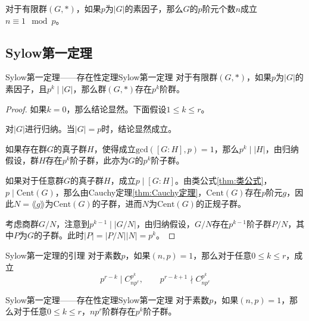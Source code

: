 \begin{corollary}
	对于有限群$(G,*)$，如果$p$为$|G|$的素因子，那么$G$的$p$阶元个数$n$成立$n\equiv 1\mod p$。
\end{corollary}

\subsection{Sylow第一定理}

\begin{theorem}{Sylow第一定理——存在性定理}{Sylow第一定理}
	对于有限群$(G,*)$，如果$p$为$|G|$的素因子，且$p^k\mid |G|$，那么群$(G,*)$存在$p^k$阶群。
\end{theorem}

\begin{proof}
	如果$k=0$，那么结论显然。下面假设$1\le k\le r$。
	
	对$|G|$进行归纳。当$|G|=p$时，结论显然成立。
	
	如果存在群$G$的真子群$H$，使得成立$\mathrm{gcd}([G:H],p)=1$，那么$p^k\mid |H|$，由归纳假设，群$H$存在$p^k$阶子群，此亦为$G$的$p^k$阶子群。
	
	如果对于任意群$G$的真子群$H$，成立$p\mid [G:H]$。由类公式\ref{thm:类公式}，$p\mid\mathrm{Cent}(G)$，那么由Cauchy定理\ref{thm:Cauchy定理}，$\mathrm{Cent}(G)$存在$p$阶元$g$，因此$N=\lang g \rang$为$\mathrm{Cent}(G)$的子群，进而$N$为$\mathrm{Cent}(G)$的正规子群。
	
	考虑商群$G/N$，注意到$p^{k-1}\mid |G/N|$，由归纳假设，$G/N$存在$p^{k-1}$阶子群$P/N$，其中$P$为$G$的子群。此时$|P|=|P/N||N|=p^k$。
\end{proof}

\begin{lemma}{}{Sylow第一定理的引理}
	对于素数$p$，如果$(n,p)=1$，那么对于任意$0\le k\le r$，成立
	$$
	p^{r-k}\mid C_{np^r}^{p^k},\qquad 
	p^{r-k+1}\nmid C_{np^r}^{p^k}
	$$
\end{lemma}

\begin{theorem}{Sylow第一定理——存在性定理}{Sylow第一定理}
	对于素数$p$，如果$(n,p)=1$，那么对于任意$0\le k\le r$，$np^r$阶群存在$p^k$阶子群。
\end{theorem}

